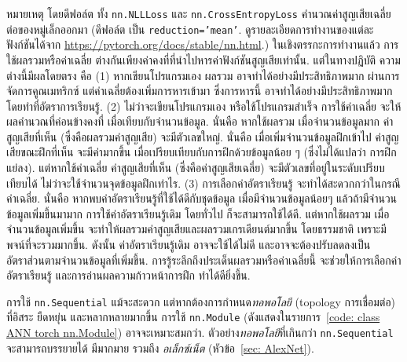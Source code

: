 หมายเหตุ 
โดยดีฟอล์ต
ทั้ง \verb|nn.NLLLoss| และ \verb|nn.CrossEntropyLoss|
คำนวณค่าสูญเสียเฉลี่ยต่อของหมู่เล็กออกมา (ดีฟอล์ต เป็น \texttt{reduction='mean'}.
ดูรายละเอียดการทำงานของแต่ละฟังก์ชันได้จาก 
\url{https://pytorch.org/docs/stable/nn.html}.)
%
%
ในเชิงตรรกะการทำงานแล้ว
การใช้ผลรวมหรือค่าเฉลี่ย ต่างกันเพียงค่าคงที่ที่นำไปหารค่าฟังก์ชันสูญเสียเท่านั้น.
แต่ในทางปฏิบัติ ความต่างนี้มีผลโดยตรง
คือ
(1)
หากเขียนโปรแกรมเอง
ผลรวม อาจทำได้อย่างมีประสิทธิภาพมาก
ผ่านการจัดการคูณเมทริกซ์ 
แต่ค่าเฉลี่ยต้องเพิ่มการหารเข้ามา
ซึ่งการหารนี้ อาจทำได้อย่างมีประสิทธิภาพมาก
โดยทำที่อัตราการเรียนรู้.
(2)
ไม่ว่าจะเขียนโปรแกรมเอง
หรือใช้โปรแกรมสำเร็จ
การใช้ค่าเฉลี่ย จะให้ผลคำนวณที่ค่อนข้างคงที่ เมื่อเทียบกับจำนวนข้อมูล.
นั่นคือ หากใช้ผลรวม เมื่อจำนวนข้อมูลมาก
ค่าสูญเสียที่เห็น (ซึ่งคือผลรวมค่าสูญเสีย)
จะมีตัวเลขใหญ่.
นั่นคือ
เมื่อเพิ่มจำนวนข้อมูลฝึกเข้าไป
ค่าสูญเสียขณะฝึกที่เห็น
จะมีค่ามากขึ้น
เมื่อเปรียบเทียบกับการฝึกด้วยข้อมูลน้อย ๆ
(ซึ่งไม่ได้แปลว่า การฝึกแย่ลง).
แต่หากใช้ค่าเฉลี่ย 
ค่าสูญเสียที่เห็น (ซึ่งคือค่าสูญเสียเฉลี่ย)
จะมีตัวเลขที่อยู่ในระดับเปรียบเทียบได้
ไม่ว่าจะใช้จำนวนจุดข้อมูลฝึกเท่าไร.
(3)
การเลือกค่าอัตราเรียนรู้
จะทำได้สะดวกกว่าในกรณีค่าเฉลี่ย.
นั่นคือ หากพบค่าอัตราเรียนรู้ที่ใช้ได้ดีกับชุดข้อมูล เมื่อมีจำนวนข้อมูลน้อยๆ 
แล้วถ้ามีจำนวนข้อมูลเพิ่มขึ้นมามาก
การใช้ค่าอัตราเรียนรู้เดิม โดยทั่วไป ก็จะสามารถใช้ได้ดี.
แต่หากใช้ผลรวม
เมื่อจำนวนข้อมูลเพิ่มขึ้น จะทำให้ผลรวมค่าสูญเสียและผลรวมเกรเดียนต์มากขึ้น
โดยธรรมชาติ เพราะมีพจน์ที่จะรวมมากขึ้น.
ดังนั้น ค่าอัตราเรียนรู้เดิม อาจจะใช้ได้ไม่ดี และอาจจะต้องปรับลดลงเป็นอัตราส่วนตามจำนวนข้อมูลที่เพิ่มขึ้น.
การรู้ระลึกถึงประเด็นผลรวมหรือค่าเฉลี่ยนี้
จะช่วยให้การเลือกค่าอัตราเรียนรู้
และการอ่านผลความก้าวหน้าการฝึก
ทำได้ดียิ่งขึ้น.

การใช้ \verb|nn.Sequential|
แม้จะสะดวก แต่หากต้องการกำหนด\textit{ทอพอโลยี} (topology การเชื่อมต่อ)
ที่อิสระ ยืดหยุ่น และหลากหลายมากขึ้น
การใช้ \verb|nn.Module| (ดังแสดงในรายการ~\ref{code: class ANN torch nn.Module}) อาจจะเหมาะสมกว่า.
ตัวอย่าง\textit{ทอพอโลยี}ที่เกินกว่า \verb|nn.Sequential| จะสามารถบรรยายได้
มีมากมาย รวมถึง \textit{อเล็กซ์เน็ต}\cite{Alexnet2012} (หัวข้อ~\ref{sec: AlexNet}).

